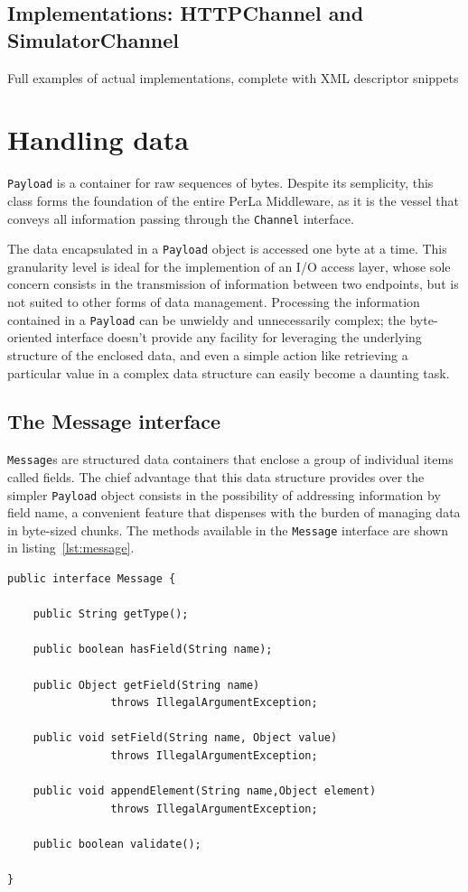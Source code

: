 \subsection{Implementations: HTTPChannel and SimulatorChannel}
\label{sec:channel.implementations}

Full examples of actual implementations, complete with XML descriptor snippets


\section{Handling data}
\label{sec:components.mapper}

\texttt{Payload} is a container for raw sequences of bytes. Despite its
semplicity, this class forms the foundation of the entire PerLa Middleware, as
it is the vessel that conveys all information passing through the
\texttt{Channel} interface.

The data encapsulated in a \texttt{Payload} object is accessed one byte at a
time. This granularity level is ideal for the implemention of an I/O access
layer, whose sole concern consists in the transmission of information between
two endpoints, but is not suited to other forms of data management. Processing
the information contained in a \texttt{Payload} can be unwieldy and
unnecessarily complex; the byte-oriented interface doesn't provide any facility
for leveraging the underlying structure of the enclosed data, and even a simple
action like retrieving a particular value in a complex data structure can
easily become a daunting task.


\subsection{The Message interface}

\texttt{Message}s are structured data containers that enclose a group of
individual items called fields. The chief advantage that this data structure
provides over the simpler \texttt{Payload} object consists in the possibility
of addressing information by field name, a convenient feature that dispenses
with the burden of managing data in byte-sized chunks. The methods available in
the \texttt{Message} interface are shown in listing~\ref{lst:message}.

\lstset{language=Java}
\begin{lstlisting}[float,floatplacement=!hbt,caption=The Message
interface,label={lst:message}]
public interface Message {

    public String getType();

    public boolean hasField(String name);

    public Object getField(String name)
                throws IllegalArgumentException;

    public void setField(String name, Object value)
                throws IllegalArgumentException;

    public void appendElement(String name,Object element)
                throws IllegalArgumentException;

    public boolean validate();

}
\end{lstlisting}

